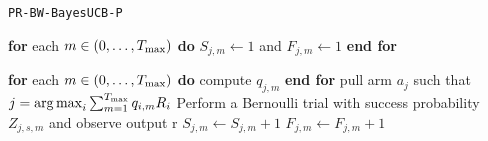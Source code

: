 \begin{algorithm}[H]
	\caption{\texttt{PR-BW-BayesUCB-P}}
	\begin{scriptsize}
		\begin{algorithmic}[1]
			
			
			
			
			
			
			 
			\State \textbf{for} each $m \in (0,\dots,T_{\textnormal{max}})$ \textbf{do} $S_{j,m} \gets 1$ and $F_{j,m} \gets 1$ \textbf{end for}
			\EndFor
			
			  
			\State \textbf{for} each $m \in (0,\dots,T_{\textnormal{max}})$ \textbf{do} compute $q_{j,m}$  \textbf{end for}
			\EndFor
			\State pull arm $a_j$ such that $j = \operatorname*{arg\,max}_i \sum_{m=1}^{T_{\textnormal{max}}}q_{i,m}R_i$
			 
					\State Perform a Bernoulli trial with success probability $Z_{j,s,m}$ and observe output r
			 \;
			\State $S_{j,m} \gets S_{j,m} + 1$ \;			
			\Else
			\State $F_{j,m} \gets F_{j,m} + 1$ \;
			
			\EndIf

			
			\EndFor
			\EndFor
			
			
			\EndFunction
			
		\end{algorithmic}
	\end{scriptsize}
	\label{alg:BayesP}
\end{algorithm}


